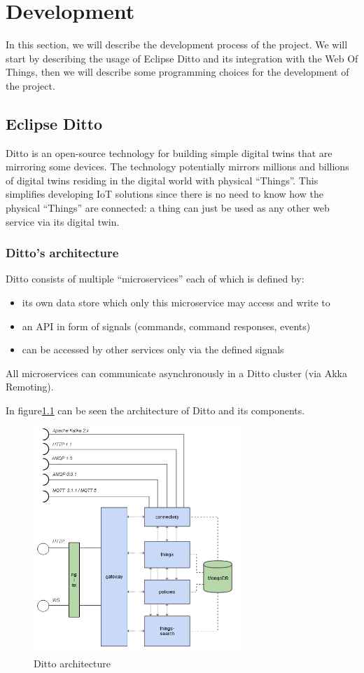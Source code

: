 \chapter{Development}
In this section, we will describe the development process of the project. We will start by describing the usage of Eclipse Ditto and its integration with the Web Of Things, then we will describe some programming choices for the development of the project.

\section{Eclipse Ditto}
Ditto is an open-source technology for building simple digital twins that are mirroring some devices.
The technology potentially mirrors millions and billions of digital twins residing in the digital world with physical ``Things''.
This simplifies developing IoT solutions since there is no need to know how the physical ``Things'' are connected:
a thing can just be used as any other web service via its digital twin.


\subsection{Ditto's architecture}
Ditto consists of multiple ``microservices'' each of which is defined by:
\begin{itemize}
  \item its own data store which only this microservice may access and write to
  \item an API in form of signals (commands, command responses, events)
  \item can be accessed by other services only via the defined signals
\end{itemize}
All microservices can communicate asynchronously in a Ditto cluster (via Akka Remoting).

In figure\ref{fig:ditto-architecture} can be seen the architecture of Ditto and its components.

\begin{figure}[H]
  \centering
  \includegraphics[width=0.7\textwidth]{img/ditto-architecture.png}
  \caption{Ditto architecture}
  \label{fig:ditto-architecture}
\end{figure}


